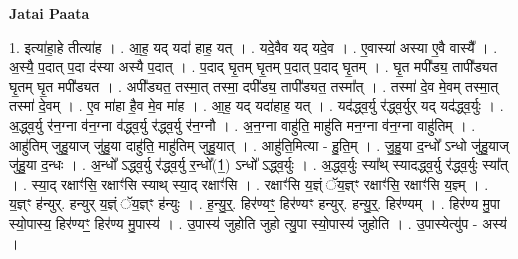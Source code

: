 \documentclass[17pt]{extarticle}
\begin{document}
\textbf{Jatai Paata} \newline

1. इत्या॑हा॒हे तीत्या॑ह । . आ॒ह॒ यद् यदा॑ हाह॒ यत् । . यदे॒वैव यद् यदे॒व । . ए॒वास्या॑ अस्या ए॒वै वास्यै᳚ । . अ॒स्यै॒ प॒दात् प॒दा द॑स्या अस्यै प॒दात् । . प॒दाद् घृ॒तम् घृ॒तम् प॒दात् प॒दाद् घृ॒तम् । . घृ॒त मपी᳚ड्य॒ तापी᳚ड्यत घृ॒तम् घृ॒त मपी᳚ड्यत । . अपी᳚ड्यत॒ तस्मा॒त् तस्मा॒ दपी᳚ड्य॒ तापी᳚ड्यत॒ तस्मा᳚त् । . तस्मा॑ दे॒व मे॒वम् तस्मा॒त् तस्मा॑ दे॒वम् । . ए॒व मा॑हा है॒व मे॒व मा॑ह । . आ॒ह॒ यद् यदा॑हाह॒ यत् । . यद॑द्ध्व॒र्यु र॑द्ध्व॒र्युर् यद् यद॑द्ध्व॒र्युः । . अ॒द्ध्व॒र्यु र॑न॒ग्ना व॑न॒ग्ना व॑द्ध्व॒र्यु र॑द्ध्व॒र्यु र॑न॒ग्नौ । . अ॒न॒ग्ना वाहु॑ति॒ माहु॑ति मन॒ग्ना व॑न॒ग्ना वाहु॑तिम् । . आहु॑तिम् जुहु॒याज् जु॑हु॒या दाहु॑ति॒ माहु॑तिम् जुहु॒यात् । . आहु॑ति॒मित्या - हु॒ति॒म् । . जु॒हु॒या द॒न्धो᳚ ऽन्धो जु॑हु॒याज् जु॑हु॒या द॒न्धः । . अ॒न्धो᳚ ऽद्ध्व॒र्यु र॑द्ध्व॒र्यु र॒न्धो᳚(1॒) ऽन्धो᳚ ऽद्ध्व॒र्युः । . अ॒द्ध्व॒र्युः स्या᳚थ् स्यादद्ध्व॒र्यु र॑द्ध्व॒र्युः स्या᳚त् । . स्या॒द् रक्षाꣳ॑सि॒ रक्षाꣳ॑सि स्याथ् स्या॒द् रक्षाꣳ॑सि । . रक्षाꣳ॑सि य॒ज्ञ्ं ॅय॒ज्ञ्ꣳ रक्षाꣳ॑सि॒ रक्षाꣳ॑सि य॒ज्ञ्म् । . य॒ज्ञ्ꣳ ह॑न्युर्. हन्युर् य॒ज्ञ्ं ॅय॒ज्ञ्ꣳ ह॑न्युः । . ह॒न्यु॒र्॒. हिर॑ण्यꣳ॒॒ हिर॑ण्यꣳ हन्युर्. हन्यु॒र्॒. हिर॑ण्यम् । . हिर॑ण्य मु॒पा स्यो॒पास्य॒ हिर॑ण्यꣳ॒॒ हिर॑ण्य मु॒पास्य॑ । . उ॒पास्य॑ जुहोति जुहो त्यु॒पा स्यो॒पास्य॑ जुहोति । . उ॒पास्येत्यु॑प - अस्य॑ । \newline
\end{document}

